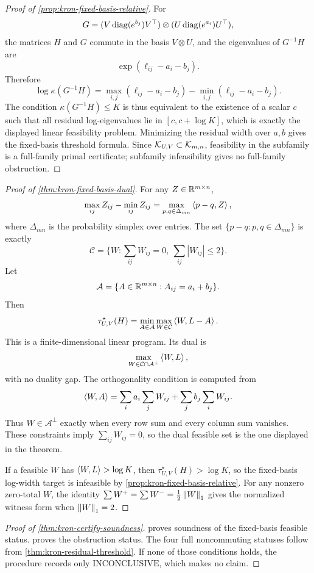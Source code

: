 \begin{proof}[Proof of \cref{prop:kron-fixed-basis-relative}]
For
\[
  G=(V\operatorname{diag}(e^{b_j})V^\top)\otimes(U\operatorname{diag}(e^{a_i})U^\top),
\]
the matrices \(H\) and \(G\) commute in the basis \(V\otimes U\), and the
eigenvalues of \(G^{-1}H\) are
\[
  \exp(\ell_{ij}-a_i-b_j).
\]
Therefore
\[
  \log\kappa(G^{-1}H)
  =
  \max_{i,j}(\ell_{ij}-a_i-b_j)
  -
  \min_{i,j}(\ell_{ij}-a_i-b_j).
\]
The condition \(\kappa(G^{-1}H)\le K\) is thus equivalent to the existence of
a scalar \(c\) such that all residual log-eigenvalues lie in
\([c,c+\log K]\), which is exactly the displayed linear feasibility problem.
Minimizing the residual width over \(a,b\) gives the fixed-basis threshold
formula. Since \(\mathcal K_{U,V}\subset\mathcal K_{m,n}\), feasibility in the subfamily
is a full-family primal certificate; subfamily infeasibility gives no
full-family obstruction.
\end{proof}

\begin{proof}[Proof of \cref{thm:kron-fixed-basis-dual}]
For any \(Z\in\mathbb R^{m\times n}\),
\[
  \max_{ij}Z_{ij}-\min_{ij}Z_{ij}
  =
  \max_{p,q\in\Delta_{mn}}\left\langle p-q,Z\right\rangle,
\]
where \(\Delta_{mn}\) is the probability simplex over entries. The set
\(\{p-q:p,q\in\Delta_{mn}\}\) is exactly
\[
  \mathcal C=\{W:\sum_{ij}W_{ij}=0,\ \sum_{ij}|W_{ij}|\le2\}.
\]
Let
\[
  \mathcal A=\{A\in\mathbb R^{m\times n}:A_{ij}=a_i+b_j\}.
\]
Then
\[
  \tau^\star_{U,V}(H)=\min_{A\in\mathcal A}\max_{W\in\mathcal C}
  \left\langle W,L-A\right\rangle.
\]
This is a finite-dimensional linear program. Its dual is
\[
  \max_{W\in\mathcal C\cap\mathcal A^\perp}\left\langle W,L\right\rangle,
\]
with no duality gap. The orthogonality condition is computed from
\[
  \left\langle W,A\right\rangle
  =
  \sum_i a_i\sum_j W_{ij}
  +
  \sum_j b_j\sum_i W_{ij}.
\]
Thus \(W\in\mathcal A^\perp\) exactly when every row sum and every column sum
vanishes. These constraints imply \(\sum_{ij}W_{ij}=0\), so the dual feasible
set is the one displayed in the theorem.

If a feasible \(W\) has \(\left\langle W,L\right\rangle>\log K\), then
\(\tau^\star_{U,V}(H)>\log K\), so the fixed-basis log-width target is
infeasible by \cref{prop:kron-fixed-basis-relative}. For any nonzero
zero-total \(W\), the identity
\(\sum W^+=\sum W^-=\frac12\left\lVert W\right\rVert_1\) gives the normalized witness form when
\(\left\lVert W\right\rVert_1=2\).
\end{proof}

\begin{proof}[Proof of \cref{thm:kron-certify-soundness}]
 proves soundness of the fixed-basis
feasible status.   proves the obstruction
status.  The four full noncommuting statuses follow from
\cref{thm:kron-residual-threshold}. If none of those conditions holds, the
procedure records only \(\mathrm{INCONCLUSIVE}\), which makes no claim.
\end{proof}

